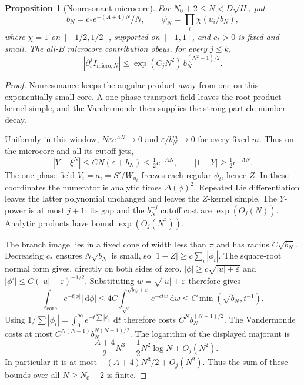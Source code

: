 \documentclass[11pt]{article}
\numberwithin{equation}{section}
\newtheorem{proposition}[theorem]{Proposition}
\theoremstyle{definition}
\newcommand{\dd}{\,\mathrm d}
\newcommand{\eps}{\varepsilon}
\begin{document}
\begin{proposition}[Nonresonant microcore]\label{prop:micro}
For \(N_0+2\le N<D\sqrt H\), put
\[
 b_N=c_*e^{-(A+4)N}/N,\qquad
 \psi_N=\prod_i\chi(u_i/b_N),
\]
where \(\chi=1\) on \([-1/2,1/2]\), supported on \([-1,1]\), and
\(c_*>0\) is fixed and small. The all-\(B\) microcore contribution
obeys, for every \(j\le k\),
\[
 |\partial_s^j I_{\mathrm{micro},N}|
 \le \exp(C_jN^2)\,b_N^{(N^2-1)/2}.
\]
\end{proposition}
\begin{proof}
Nonresonance keeps the angular product away from one on this exponentially small core. A one-phase transport field leaves the root-product kernel simple, and the Vandermonde then supplies the strong particle-number decay.

Uniformly in this window,
\(N\eps e^{AN}\to0\) and \(\eps/b_N^m\to0\) for every fixed \(m\).
Thus on the microcore and all its cutoff jets,
\[
 |Y-\xi^N|\le CN(\eps+b_N)\le\tfrac12e^{-AN},
 \qquad |1-Y|\ge\tfrac12e^{-AN}.
\]
The one-phase field \(V_i=a_i=S'/W_{u_i}\) freezes each regular
\(\phi_i\), hence \(Z\). In these coordinates the numerator is
analytic times \(\Delta(\phi)^2\).
Repeated Lie differentiation leaves the latter polynomial unchanged
and leaves the \(Z\)-kernel simple. The \(Y\)-power is at most
\(j+1\); its gap and the \(b_N^{-j}\) cutoff cost are
\(\exp(O_j(N))\). Analytic products have bound \(\exp(O_j(N^2))\).

The branch image lies in a fixed cone of width less than \(\pi\)
and has radius \(C\sqrt{b_N}\). Decreasing \(c_*\) ensures
\(N\sqrt{b_N}\) is small, so
\(|1-Z|\ge c\sum_i|\phi_i|\).
The square-root normal form gives, directly on both sides of zero,
\(|\phi|\ge c\sqrt{|u|+\eps}\) and
\(|\phi'|\le C(|u|+\eps)^{-1/2}\). Substituting
\(w=\sqrt{|u|+\eps}\) therefore gives
\[
 \int_{\mathrm{core}}e^{-t|\phi|}|\dd\phi|
       \le4C\int_{\sqrt\eps}^{\sqrt{b_N+\eps}}e^{-ctw}\dd w
       \le C\min(\sqrt{b_N},t^{-1}).
\]
Using \(1/\sum|\phi_i|=\int_0^\infty e^{-t\sum|\phi_i|}\dd t\)
therefore costs \(C^N b_N^{(N-1)/2}\).
The Vandermonde costs at most
\(C^{N(N-1)}b_N^{N(N-1)/2}\).
The logarithm of the displayed majorant is
\[
 -\frac{A+4}{2}N^3-\frac12N^2\log N+O_j(N^2).
\]
In particular it is at most \(-(A+4)N^3/2+O_j(N^2)\).
Thus the sum of these bounds over all \(N\ge N_0+2\) is finite.
\end{proof}
\end{document}
